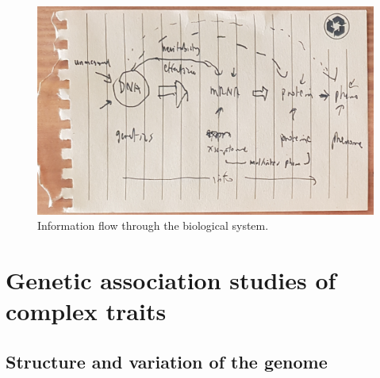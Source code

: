 \begin{outline}
\begin{figure}
    \centering
    \includegraphics[width=1.0\textwidth,page=1]{mainmatter/figures/chapter_01/fig_mockup_systemsBio_Screenshot 2020-05-21 at 17.08.47.png}
    \caption{Information flow through the biological system.}
    \label{fig:intro_sysBio}
\end{figure}

\section{Genetic association studies of complex traits}

\subsection{Structure and variation of the genome}


\end{outline}
